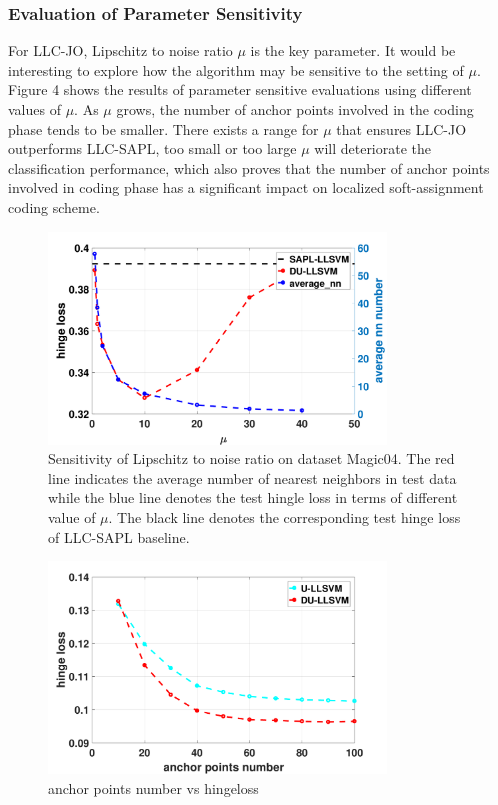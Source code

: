 \documentclass{llncs}
\begin{document}
	\subsubsection{Evaluation of Parameter Sensitivity}
	For LLC-JO, Lipschitz to noise ratio $\mu$ is the key parameter. It would be interesting to explore how the algorithm may be sensitive to the setting of $\mu$. Figure 4 shows the results of parameter sensitive evaluations using different values of $\mu$. As $\mu$ grows, the number of anchor points involved in the coding phase tends to be smaller. There exists a range for $\mu$ that ensures LLC-JO outperforms LLC-SAPL, too small or too large $\mu$ will deteriorate the classification performance, which also proves that the number of anchor points involved in coding phase has a significant impact on localized soft-assignment coding scheme.
	\begin{figure}[!tbp]
		\centering
		\includegraphics[width=0.8\textwidth]{figs/magic04_lip.pdf}
		\caption{Sensitivity of Lipschitz to noise ratio on dataset Magic04. The red line indicates the average number of nearest neighbors in test data while the blue line denotes the test hingle loss in terms of different value of $\mu$. The black line denotes the corresponding test hinge loss of LLC-SAPL baseline.}
	\end{figure}

	\begin{figure}[!tbp]
		\centering
		\includegraphics[width=0.8\textwidth]{figs/anchor_points.pdf}
		\caption{anchor points number vs hingeloss}
	\end{figure}
\end{document}
